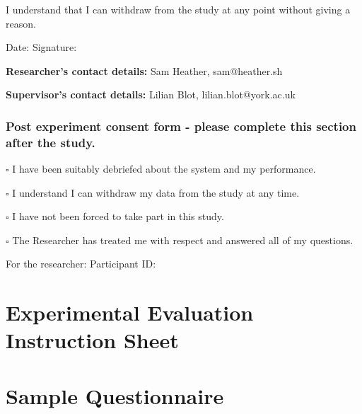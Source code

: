 \documentclass[authoryearcitations]{UoYCSproject}
\begin{document}
{I understand that I can withdraw from the study at any point without giving a reason.

Date: \textunderscore\textunderscore\textunderscore\textunderscore\textunderscore\textunderscore\textunderscore\textunderscore\textunderscore\textunderscore\textunderscore\textunderscore\textunderscore\textunderscore\textunderscore\textunderscore\textunderscore\textunderscore\textunderscore\textunderscore\textunderscore
Signature: \textunderscore\textunderscore\textunderscore\textunderscore\textunderscore\textunderscore\textunderscore\textunderscore\textunderscore\textunderscore\textunderscore\textunderscore\textunderscore\textunderscore\textunderscore\textunderscore\textunderscore\textunderscore\textunderscore\textunderscore\textunderscore

{\bf Researcher's contact details:} Sam Heather, sam@heather.sh

{\bf Supervisor's contact details:} Lilian Blot, lilian.blot@york.ac.uk

\pagebreak

\subsection*{Post experiment consent form - please complete this section after the study.}
$\square$ I have been suitably debriefed about the system and my performance.

$\square$ I understand I can withdraw my data from the study at any time.

$\square$ I have not been forced to take part in this study.

$\square$ The Researcher has treated me with respect and answered all of my questions.

\vspace{10 mm}

For the researcher: Participant ID: \textunderscore\textunderscore\textunderscore\textunderscore\textunderscore

}

\chapter{Experimental Evaluation Instruction Sheet}
\label{sec:appendixExperimentalInstructions}


\newpage
\chapter{Sample Questionnaire}
\label{sec:appendixQuestionnaire}

\end{document}
